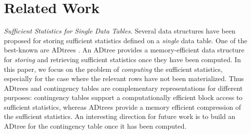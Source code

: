\documentclass{sig-alternate-2013}
\begin{document}
\section{Related Work} 

{\em Sufficient Statistics for Single Data Tables.} Several data structures have been proposed for storing sufficient statistics defined on a {\em single} data table. 
One of the best-known are ADtrees \cite{Moore1998}. 
An ADtree provides a memory-efficient data structure for {\em storing} and retrieving sufficient statistics once they have been computed. 
In this paper, we focus on the problem of {\em computing} the sufficient statistics, especially for the case where the relevant rows have not been materialized. 
Thus ADtrees and contingency tables are complementary representations for different purposes: contingency tables support a computationally efficient block access to sufficient statistics, whereas ADtrees provide a memory efficient compression of the sufficient statistics. 
An interesting direction for future work is to build an ADtree for the contingency table once it has been computed. 
%
\end{document}
